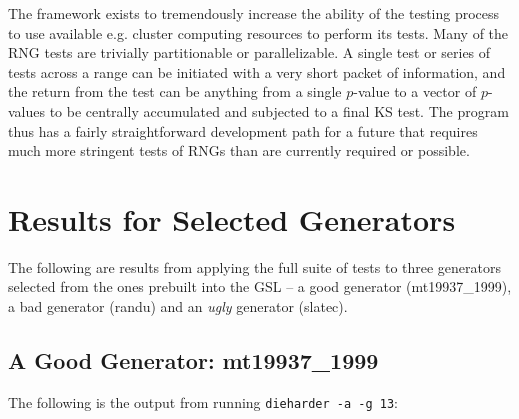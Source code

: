 \documentclass[12pt]{article}
\begin{document}
The framework exists to tremendously increase the ability of the testing
process to use available e.g. cluster computing resources to perform its
tests.  Many of the RNG tests are trivially partitionable or
parallelizable.  A single test or series of tests across a range can be
initiated with a very short packet of information, and the return from
the test can be anything from a single $p$-value to a vector of
$p$-values to be centrally accumulated and subjected to a final KS test.
The program thus has a fairly straightforward development path for a
future that requires much more stringent tests of RNGs than are
currently required or possible.

\section{Results for Selected Generators}

The following are results from applying the full suite of tests to three
generators selected from the ones prebuilt into the GSL -- a good
generator (mt19937\_1999), a bad generator (randu) and an {\em ugly}
generator (slatec).

\subsection{A Good Generator: mt19937\_1999}

The following is the output from running {\tt dieharder -a -g 13}:
\end{document}
